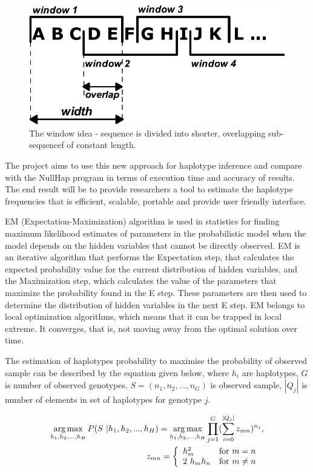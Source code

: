 \documentclass[]{spie}
\newcommand{\argmax}{\operatornamewithlimits{arg\,max}}
\begin{document}
\begin{figure}[!htb]
\centering
\includegraphics[scale=0.7]{images/window}
\caption{The window idea - sequence is divided into shorter, overlapping sub-sequencef of constant length.}
\label{fig:window}
\end{figure}


The project aims to use this new approach for haplotype inference and compare with the NullHap program in terms of execution time and accuracy of results.
The end result will be to provide researchers a tool to estimate the haplotype frequencies that is efficient, scalable, portable and provide user friendly interface.

EM (Expectation-Maximization) algorithm  is used in statistics for finding maximum likelihood estimates of parameters in the probabilistic model when the model depends on the hidden variables that cannot be directly observed.
EM is an iterative algorithm that performs the Expectation step, that calculates the expected probability value for the current distribution of hidden variables, and the Maximization step, which calculates the value of the parameters that maximize the probability found in the E step.
These parameters are then used to determine the distribution of hidden variables in the next E step.
EM belongs to local optimization algorithms, which means that it can be trapped in local extreme.
It converges, that is, not moving away from the optimal solution over time.

The estimation of haplotypes probability to maximise the probability of observed sample
can be described by the equation given below, where $h_{i}$ are haplotypes, $G$ is number of observed genotypes,
$S = (n_{1}, n_{2},\ldots{},n_{G})$ is observed sample, $|Q_{j}|$ is number of elements in set of haplotypes for genotype $j$.

\begin{eqnarray*}
  \argmax_{h_{1}, h_{2}, ..., h_{H}} P( S~| h_{1}, h_{2}, ..., h_{H} ) =
  \argmax_{h_{1}, h_{2}, ..., h_{H}} \prod_{j=1}^{G}(\sum_{i=0}^{|Q_{j}|}z_{mn})^{n_{j}},
  \\
  ~z_{mn} =
  \left\{
  \begin{array}{ll}
    h_{m}^2          & \mbox{for}~m = n~\\
    2~h_{m} h_{n}    & \mbox{for}~m \not = n
  \end{array}
  \right.
  \nonumber
  \label{eqZadanie}
\end{eqnarray*}
\end{document}
